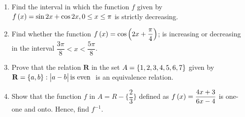 \begin{enumerate}
\item Find the interval in which the function $f$ given by $f\left(x\right)=\sin2x+\cos2x,0\leq{x}\leq{\pi}$ is strictly decreasing.

\item  Find whether the function $f\left(x\right) = \cos\left(2x + \dfrac{\pi}{4}\right)$; is increasing or decreasing in the interval $\dfrac{3\pi}{8} < x < \dfrac{5\pi}{8}$.

\item Prove that the relation $\mathbf{R}$ in the set $A = \left\{1,2,3,4,5,6,7\right\}$ given by $\mathbf{R}=\left\{a,b\right\}:\begin{vmatrix}a-b\end{vmatrix}\text {is even }$ is an equivalence relation.

\item Show that the function $f$ in $A = R-\{\dfrac{2}{3}\}$ defined as $f\left(x\right) = \dfrac{4x+3}{6x-4}$ is one-one and onto. Hence, find $f^{-1}$.



\end{enumerate}
